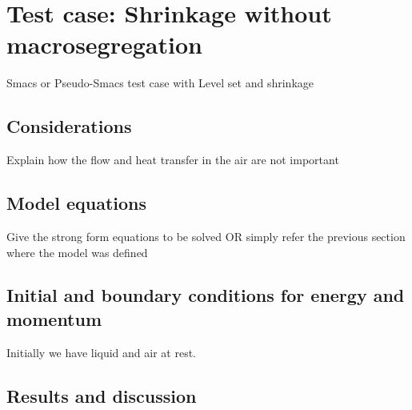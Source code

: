 \section{Test case: Shrinkage without macrosegregation}
Smacs or Pseudo-Smacs test case with Level set and shrinkage
\subsection{Considerations}
Explain how the flow and heat transfer in the air are not important \\ 
\subsection{Model equations}
Give the strong form equations to be solved OR simply refer the previous section where the model was defined
\subsection{Initial and boundary conditions for energy and momentum}
Initially we have liquid and air at rest. 
\subsection{Results and discussion}

